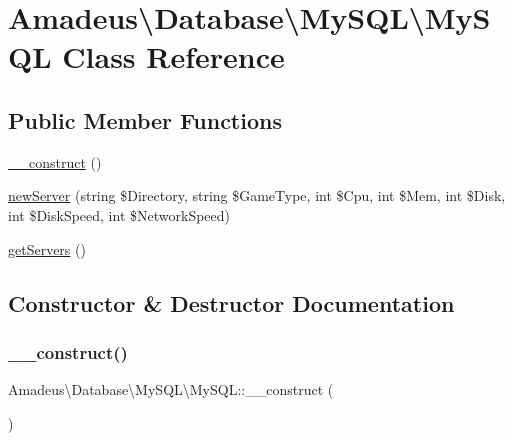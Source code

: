 \hypertarget{classAmadeus_1_1Database_1_1MySQL_1_1MySQL}{}\section{Amadeus\textbackslash{}Database\textbackslash{}My\+S\+QL\textbackslash{}My\+S\+QL Class Reference}
\label{classAmadeus_1_1Database_1_1MySQL_1_1MySQL}
\subsection*{Public Member Functions}
\begin{DoxyCompactItemize}
\item 
\hyperlink{classAmadeus_1_1Database_1_1MySQL_1_1MySQL_a26b652bfe962c3c4a64c69d0e194093c}{\+\_\+\+\_\+construct} ()
\item 
\hyperlink{classAmadeus_1_1Database_1_1MySQL_1_1MySQL_a7858872437be1ddd6ca2500a9ab12183}{new\+Server} (string \$Directory, string \$Game\+Type, int \$Cpu, int \$Mem, int \$Disk, int \$Disk\+Speed, int \$Network\+Speed)
\item 
\hyperlink{classAmadeus_1_1Database_1_1MySQL_1_1MySQL_a96eabea2db2affac17e1c660117682b1}{get\+Servers} ()
\end{DoxyCompactItemize}


\subsection{Constructor \& Destructor Documentation}
\mbox{\label{classAmadeus_1_1Database_1_1MySQL_1_1MySQL_a26b652bfe962c3c4a64c69d0e194093c}} 
\subsubsection{\texorpdfstring{\+\_\+\+\_\+construct()}{\_\_construct()}}
{\footnotesize\ttfamily Amadeus\textbackslash{}\+Database\textbackslash{}\+My\+S\+Q\+L\textbackslash{}\+My\+S\+Q\+L\+::\+\_\+\+\_\+construct (\begin{DoxyParamCaption}{ }\end{DoxyParamCaption})}

